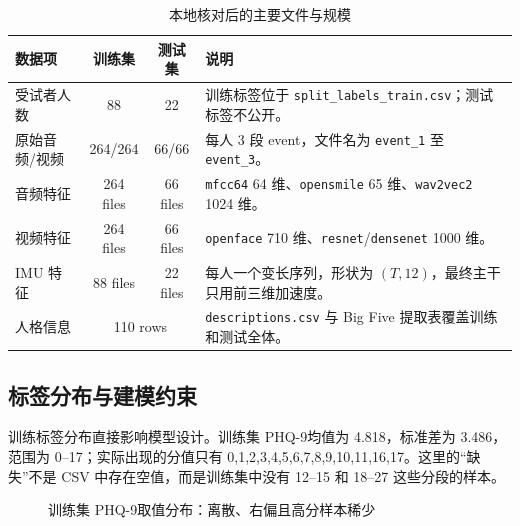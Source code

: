 \documentclass[UTF8,zihao=-4,fontset=windows]{ctexart}
\newcommand{\code}[1]{\texttt{#1}}
\newcommand{\phq}{PHQ-9}
\newcommand{\tightcaption}[1]{\caption{#1}\vspace{-0.4em}}
\begin{document}
\begin{table}[H]
  \centering
  \caption{本地核对后的主要文件与规模}
  \begin{tabularx}{\linewidth}{l c c X}
    \toprule
    数据项 & 训练集 & 测试集 & 说明 \\
    \midrule
    受试者人数 & 88 & 22 & 训练标签位于 \code{split\_labels\_train.csv}；测试标签不公开。 \\
    原始音频/视频 & 264/264 & 66/66 & 每人 3 段 event，文件名为 \code{event\_1} 至 \code{event\_3}。 \\
    音频特征 & 264 files & 66 files & \code{mfcc64} 64 维、\code{opensmile} 65 维、\code{wav2vec2} 1024 维。 \\
    视频特征 & 264 files & 66 files & \code{openface} 710 维、\code{resnet}/\code{densenet} 1000 维。 \\
    IMU 特征 & 88 files & 22 files & 每人一个变长序列，形状为 $(T,12)$，最终主干只用前三维加速度。 \\
    人格信息 & \multicolumn{2}{c}{110 rows} & \code{descriptions.csv} 与 Big Five 提取表覆盖训练和测试全体。 \\
    \bottomrule
  \end{tabularx}
\end{table}

\subsection{标签分布与建模约束}

训练标签分布直接影响模型设计。训练集 \phq 均值为 4.818，标准差为 3.486，范围为 0--17；实际出现的分值只有 0,1,2,3,4,5,6,7,8,9,10,11,16,17。这里的“缺失”不是 CSV 中存在空值，而是训练集中没有 12--15 和 18--27 这些分段的样本。

\begin{figure}[H]
  \centering
  \tightcaption{训练集 \phq 取值分布：离散、右偏且高分样本稀少}
  \label{fig:phq-dist}
\end{figure}
\end{document}
